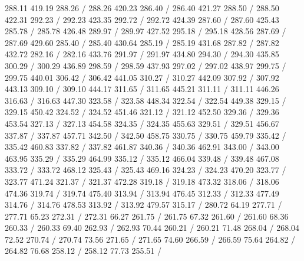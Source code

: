 { 288.11 419.19 288.26 /
 288.26 420.23 286.40 /
 286.40 421.27 288.50 /
 288.50 422.31 292.23 /
 292.23 423.35 292.72 /
 292.72 424.39 287.60 /
 287.60 425.43 285.78 /
 285.78 426.48 289.97 /
 289.97 427.52 295.18 /
 295.18 428.56 287.69 /
 287.69 429.60 285.40 /
 285.40 430.64 285.19 /
 285.19 431.68 287.82 /
 287.82 432.72 282.16 /
 282.16 433.76 291.97 /
 291.97 434.80 294.30 /
 294.30 435.85 300.29 /
 300.29 436.89 298.59 /
 298.59 437.93 297.02 /
 297.02 438.97 299.75 /
 299.75 440.01 306.42 /
 306.42 441.05 310.27 /
 310.27 442.09 307.92 /
 307.92 443.13 309.10 /
 309.10 444.17 311.65 /
 311.65 445.21 311.11 /
 311.11 446.26 316.63 /
 316.63 447.30 323.58 /
 323.58 448.34 322.54 /
 322.54 449.38 329.15 /
 329.15 450.42 324.52 /
 324.52 451.46 321.12 /
 321.12 452.50 329.36 /
 329.36 453.54 327.13 /
 327.13 454.58 324.35 /
 324.35 455.63 329.51 /
 329.51 456.67 337.87 /
 337.87 457.71 342.50 /
 342.50 458.75 330.75 /
 330.75 459.79 335.42 /
 335.42 460.83 337.82 /
 337.82 461.87 340.36 /
 340.36 462.91 343.00 /
 343.00 463.95 335.29 /
 335.29 464.99 335.12 /
 335.12 466.04 339.48 /
 339.48 467.08 333.72 /
 333.72 468.12 325.43 /
 325.43 469.16 324.23 /
 324.23 470.20 323.77 /
 323.77 471.24 321.37 /
 321.37 472.28 319.18 /
 319.18 473.32 318.06 /
 318.06 474.36 319.74 /
 319.74 475.40 313.94 /
 313.94 476.45 312.33 /
 312.33 477.49 314.76 /
 314.76 478.53 313.92 /
 313.92 479.57 315.17 /
\setsolid
{} 280.72 64.19 277.71 /
 277.71 65.23 272.31 /
 272.31 66.27 261.75 /
 261.75 67.32 261.60 /
 261.60 68.36 260.33 /
 260.33 69.40 262.93 /
 262.93 70.44 260.21 /
 260.21 71.48 268.04 /
 268.04 72.52 270.74 /
 270.74 73.56 271.65 /
 271.65 74.60 266.59 /
 266.59 75.64 264.82 /
 264.82 76.68 258.12 /
 258.12 77.73 255.51 /
}
